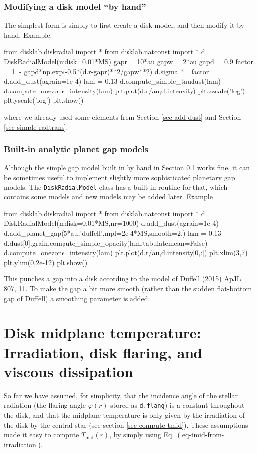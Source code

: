 \documentclass{book}
\newcommand{\code}[1]{{\small\tt #1}}
\begin{document}
\subsection{Modifying a disk model ``by hand''}\label{sec-modif-by-hand}
The simplest form is simply to first create a disk model, and then modify
it by hand. Example:
\begin{codebox}
from disklab.diskradial import *
from disklab.natconst import *
d = DiskRadialModel(mdisk=0.01*MS)
gapr = 10*au
gapw = 2*au
gapd = 0.9
factor = 1. - gapd*np.exp(-0.5*(d.r-gapr)**2/gapw**2)
d.sigma *= factor
d.add_dust(agrain=1e-4)
lam = 0.13
d.compute_simple_taudust(lam)
d.compute_onezone_intensity(lam)
plt.plot(d.r/au,d.intensity)
plt.xscale('log')
plt.yscale('log')
plt.show()
\end{codebox}
\noindent where we already used some elements from Section \ref{sec-add-dust} and
Section \ref{sec-simple-radtrans}.

\subsection{Built-in analytic planet gap models}
Although the simple gap model built in by hand in Section \ref{sec-modif-by-hand}
works fine, it can be sometimes useful to implement slightly more sophisticated
planetary gap models. The \code{DiskRadialModel} class has a built-in routine for that,
which contains some models and new models may be added later. Example
\begin{codebox}
from disklab.diskradial import *
from disklab.natconst import *
d = DiskRadialModel(mdisk=0.01*MS,nr=1000)
d.add_dust(agrain=1e-4)
d.add_planet_gap(5*au,'duffell',mpl=2e-4*MS,smooth=2.)
lam = 0.13
d.dust[0].grain.compute_simple_opacity(lam,tabulatemean=False)
d.compute_onezone_intensity(lam)
plt.plot(d.r/au,d.intensity[0,:])
plt.xlim(3,7)
plt.ylim(0,2e-12)
plt.show()
\end{codebox}
This punches a gap into a disk according to the model of Duffell (2015) ApJL
807, 11. To make the gap a bit more smooth (rather than the sudden flat-bottom
gap of Duffell) a smoothing parameter is added.

\chapter{Disk midplane temperature: Irradiation, disk flaring, and viscous dissipation}
\label{sec-irradiation-flaring-viscous-heating}
%
So far we have assumed, for simplicity, that the incidence angle of the stellar
radiation (the flaring angle $\varphi(r)$ stored as \code{d.flang}) is a
constant throughout the disk, and that the midplane temperature is only given by
the irradiation of the disk by the central star (see section
\ref{sec-compute-tmid}). These assumptions made it easy to compute
$T_{\mathrm{mid}}(r)$, by simply using Eq.~(\ref{eq-tmid-from-irradiation}).
\end{document}
